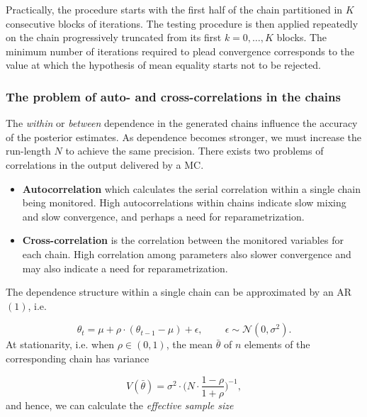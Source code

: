 Practically, the procedure starts with the first half of the chain partitioned in $K$ consecutive blocks of iterations. The testing procedure is then applied repeatedly on the chain progressively truncated from its first $k= 0,\ldots,K$ blocks. The minimum number of iterations required to plead convergence corresponds to the value at which the hypothesis of mean equality starts not to be rejected.





\subsubsection*{The problem of auto- and cross-correlations in the chains}

The \emph{within} or \emph{between} dependence in the generated chains influence the accuracy of the posterior estimates. As dependence becomes stronger, we must increase the run-length $N$ to achieve the same precision. 
There exists two problems of correlations in the output delivered by a MC. 

\begin{itemize}
	\item \textbf{Autocorrelation} which calculates the serial correlation within a single chain being monitored. High autocorrelations within chains indicate slow mixing and slow convergence, and perhaps a need for reparametrization.
	
	\item \textbf{Cross-correlation} is the correlation between the monitored variables for each chain. High correlation among parameters also slower convergence and may also indicate a need for reparametrization. 
\end{itemize}
The dependence structure within a single chain can be approximated by an AR$(1)$, i.e. 

\begin{equation*}
\theta_t=\mu + \rho\cdot (\theta_{t-1}-\mu)+\epsilon, \qquad \ \epsilon\sim \mathcal{N}(0,\sigma^2).
\end{equation*}
At stationarity, i.e. when $\rho\in(0,1)$, the mean $\bar{\theta}$ of $n$ elements of the corresponding chain has variance

\begin{equation*} V(\bar{\theta})=\sigma^2\cdot \bigg(N\cdot \frac{1-\rho}{1+\rho}\bigg)^{-1},
\end{equation*}
and hence, we can calculate the \emph{effective sample size} 

